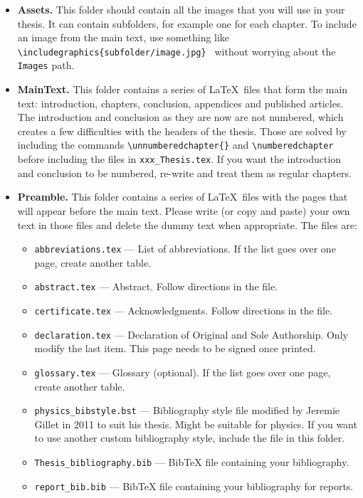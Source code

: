 \begin{itemize}

    \item \textbf{Assets.} This folder should contain all the images that you will use in your thesis. It can contain subfolders, for example one for each chapter. To include an image from the main text, use something like \texttt{\textbackslash includegraphics\{subfolder/image.jpg\} } without worrying about the \texttt{Images} path.

    \item \textbf{MainText.} This folder contains a series of \LaTeX\ files that form the main text: introduction, chapters, conclusion, appendices and published articles. The introduction and conclusion as they are now are not numbered, which creates a few difficulties with the headers of the thesis. Those are solved by including the commands \texttt{\textbackslash unnumberedchapter\{\}} and \texttt{\textbackslash numberedchapter} before including the files in \texttt{xxx\_Thesis.tex}. If you want the introduction and conclusion to be numbered, re-write and treat them as regular chapters.
    
    \item \textbf{Preamble.} This folder contains a series of \LaTeX\ files with the pages that will appear before the main text. Please write (or copy and paste) your own text in those files and delete the dummy text when appropriate. The files are:
    \begin{itemize}
    \item \texttt{abbreviations.tex} --- List of abbreviations. If the list goes over one page, create another table.
    \item \texttt{abstract.tex} --- Abstract. Follow directions in the file.
    \item \texttt{certificate.tex} --- Acknowledgments. Follow directions in the file.
    \item \texttt{declaration.tex} --- Declaration of Original and Sole Authorship. Only modify the last item. This page needs to be signed once printed.
    \item \texttt{glossary.tex} --- Glossary (optional). If the list goes over one page, create another table.
    \item \texttt{physics\_bibstyle.bst} --- Bibliography style file modified by Jeremie Gillet in 2011 to suit his thesis. Might be suitable for physics. If you want to use another custom bibliography style, include the file in this folder.
    \item \texttt{Thesis\_bibliography.bib} --- BibTeX file containing your bibliography.
    \item \texttt{report\_bib.bib} --- BibTeX file containing your bibliography for reports.
    \end{itemize}
    
    \end{itemize}


